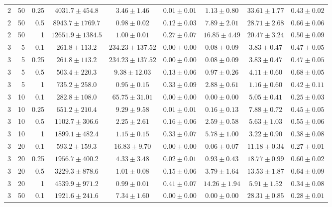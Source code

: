 \begin{table}[htbp]
\begin{tabular}{@{}rrrcccccc@{}}
2 & 50 & 0.25 & $4031.7 \pm 454.8$ & $3.46 \pm 1.46$ & $0.01 \pm 0.01$ & $1.13 \pm 0.80$ & $33.61 \pm 1.77$ & $0.43 \pm 0.02$ \\
2 & 50 & 0.5 & $8943.7 \pm 1769.7$ & $0.98 \pm 0.02$ & $0.12 \pm 0.03$ & $7.89 \pm 2.01$ & $28.71 \pm 2.68$ & $0.66 \pm 0.06$ \\
2 & 50 & 1 & $12651.9 \pm 1384.5$ & $1.00 \pm 0.01$ & $0.27 \pm 0.07$ & $16.85 \pm 4.49$ & $20.47 \pm 3.24$ & $0.50 \pm 0.09$ \\
\midrule
3 & 5 & 0.1 & $261.8 \pm 113.2$ & $234.23 \pm 137.52$ & $0.00 \pm 0.00$ & $0.08 \pm 0.09$ & $3.83 \pm 0.47$ & $0.47 \pm 0.05$ \\
3 & 5 & 0.25 & $261.8 \pm 113.2$ & $234.23 \pm 137.52$ & $0.00 \pm 0.00$ & $0.08 \pm 0.09$ & $3.83 \pm 0.47$ & $0.47 \pm 0.05$ \\
3 & 5 & 0.5 & $503.4 \pm 220.3$ & $9.38 \pm 12.03$ & $0.13 \pm 0.06$ & $0.97 \pm 0.26$ & $4.11 \pm 0.60$ & $0.68 \pm 0.05$ \\
3 & 5 & 1 & $735.2 \pm 258.0$ & $0.95 \pm 0.15$ & $0.33 \pm 0.09$ & $2.88 \pm 0.61$ & $1.16 \pm 0.60$ & $0.42 \pm 0.11$ \\
3 & 10 & 0.1 & $282.8 \pm 108.0$ & $65.75 \pm 31.01$ & $0.00 \pm 0.00$ & $0.00 \pm 0.00$ & $5.05 \pm 0.41$ & $0.25 \pm 0.03$ \\
3 & 10 & 0.25 & $651.2 \pm 210.4$ & $9.29 \pm 9.58$ & $0.01 \pm 0.01$ & $0.16 \pm 0.13$ & $7.88 \pm 0.72$ & $0.45 \pm 0.05$ \\
3 & 10 & 0.5 & $1102.7 \pm 306.6$ & $2.25 \pm 2.61$ & $0.16 \pm 0.06$ & $2.59 \pm 0.58$ & $5.63 \pm 1.03$ & $0.55 \pm 0.06$ \\
3 & 10 & 1 & $1899.1 \pm 482.4$ & $1.15 \pm 0.15$ & $0.33 \pm 0.07$ & $5.78 \pm 1.00$ & $3.22 \pm 0.90$ & $0.38 \pm 0.08$ \\
3 & 20 & 0.1 & $593.2 \pm 159.3$ & $16.83 \pm 9.70$ & $0.00 \pm 0.00$ & $0.06 \pm 0.07$ & $11.18 \pm 0.34$ & $0.27 \pm 0.01$ \\
3 & 20 & 0.25 & $1956.7 \pm 400.2$ & $4.33 \pm 3.48$ & $0.02 \pm 0.01$ & $0.93 \pm 0.43$ & $18.77 \pm 0.99$ & $0.60 \pm 0.02$ \\
3 & 20 & 0.5 & $3229.3 \pm 878.6$ & $1.01 \pm 0.08$ & $0.15 \pm 0.06$ & $3.79 \pm 1.64$ & $13.53 \pm 1.87$ & $0.64 \pm 0.09$ \\
3 & 20 & 1 & $4539.9 \pm 971.2$ & $0.99 \pm 0.01$ & $0.41 \pm 0.07$ & $14.26 \pm 1.94$ & $5.91 \pm 1.52$ & $0.34 \pm 0.08$ \\
3 & 50 & 0.1 & $1921.6 \pm 241.6$ & $7.34 \pm 1.60$ & $0.00 \pm 0.00$ & $0.00 \pm 0.00$ & $28.31 \pm 0.85$ & $0.28 \pm 0.01$ \\

\end{tabular}
\end{table}
